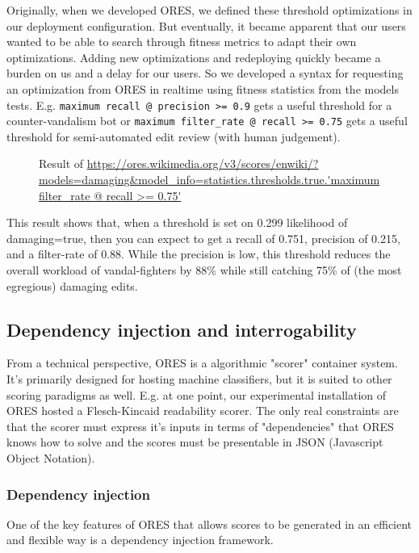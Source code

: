 Originally, when we developed ORES, we defined these threshold optimizations in our deployment configuration.  But eventually, it became apparent that our users wanted to be able to search through fitness metrics to adapt their own optimizations.  Adding new optimizations and redeploying quickly became a burden on us and a delay for our users.  So we developed a syntax for requesting an optimization from ORES in realtime using fitness statistics from the models tests. E.g. \texttt{maximum recall @ precision >= 0.9} gets a useful threshold for a counter-vandalism bot or \texttt{maximum filter\_rate @ recall >= 0.75} gets a useful threshold for semi-automated edit review (with human judgement).

\begin{figure}[htbp]
        \caption{Result of \url{https://ores.wikimedia.org/v3/scores/enwiki/?models=damaging&model_info=statistics.thresholds.true.'maximum filter_rate @ recall >= 0.75'}}
        \label{fig:english_damaging_threshold_optimization}
\end{figure}

This result shows that, when a threshold is set on 0.299 likelihood of damaging=true, then you can expect to get a recall of 0.751, precision of 0.215, and a filter-rate of 0.88.  While the precision is low, this threshold reduces the overall workload of vandal-fighters by 88\% while still catching 75\% of (the most egregious) damaging edits.

\subsection{Dependency injection and interrogability}
From a technical perspective, ORES is a algorithmic "scorer" container system.  It's primarily designed for hosting machine classifiers, but it is suited to other scoring paradigms as well.  E.g. at one point, our experimental installation of ORES hosted a Flesch-Kincaid readability scorer.  The only real constraints are that the scorer must express it's inputs in terms of "dependencies" that ORES knows how to solve and the scores must be presentable in JSON (Javascript Object Notation).

\subsubsection{Dependency injection}
One of the key features of ORES that allows scores to be generated in an efficient and flexible way is a dependency injection framework.

